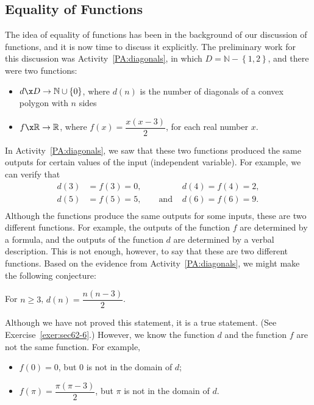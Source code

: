 \subsection*{Equality of Functions}
The idea of equality of functions has been in the background of our discussion of functions, and it is now time to discuss it explicitly.  The preliminary work for this discussion was \typeu Activity~\ref*{PA:diagonals}, in which 
$D = \mathbb{N} - \left\{ {1, 2} \right\}$, and there were two functions:
\begin{itemize}
\item $d\x D \to \mathbb{N} \cup \left\{ 0 \right\}$, where  $d( n )$ is the number of diagonals of a convex polygon with  $n$  sides

\item $f\x \mathbb{R} \to \mathbb{R}$, where  
$f( x ) = \dfrac{{x\left( {x - 3} \right)}}{2}$, for each real number $x$.
\end{itemize}

In \typeu Activity~\ref*{PA:diagonals}, we saw that these two functions produced the same outputs for certain values of the input (independent variable).  For example, we can verify that
\begin{align*}
  d( 3 ) &= f( 3 ) = 0, \qquad &d( 4 ) = f( 4 ) = 2,\\ 
  d( 5 ) &= f( 5 ) = 5, \qquad \text{and }  &d( 6 ) = f( 6 ) = 9. \\ 
\end{align*}
Although the functions produce the same outputs for some inputs, these are two different functions.  For example, the outputs of the function  $f$  are determined  by a formula, and the outputs of the function  $d$  are determined by a verbal description.  This is not enough, however, to say that these are two different functions.  Based on the evidence from \typeu Activity~\ref*{PA:diagonals},  we might make the following conjecture:
\begin{center}
For  $n \geq 3$,  $d( n ) = \dfrac{{n\left( {n - 3} \right)}}{2}$.
\end{center}
Although we have not proved this statement, it is a true statement. (See Exercise~\ref{exer:sec62-6}.)  However, we know the function $d$ and the function $f$ are not the same function.  For example,
\begin{itemize}
\item $f( 0 ) = 0$,  but  0  is not in the domain of  $d$;

\item $f( \pi ) = \dfrac{{\pi \left( {\pi  - 3} \right)}}{2}$, but $\pi $ is not in the domain of  $d$.

\end{itemize}

